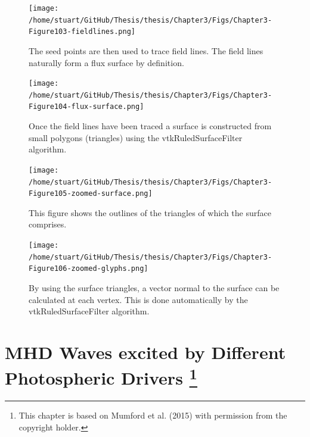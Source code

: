 \documentclass[a4paper,12pt,fourier,authoryear,custommargin]{Classes/PhDThesisPSnPDF}
\providecommand{\DIFdelbegin}{} %
\providecommand{\DIFdelend}{} %
\begin{document}
\begin{figure}[H]
    \centering
    \texttt{[image: /home/stuart/GitHub/Thesis/thesis/Chapter3/Figs/Chapter3-Figure103-fieldlines.png]}
    \caption{The seed points are then used to trace field lines. The field lines naturally form a flux surface by definition.}
    \label{fig:fieldlines}
\end{figure}

\begin{figure}[H]
    \centering
    \texttt{[image: /home/stuart/GitHub/Thesis/thesis/Chapter3/Figs/Chapter3-Figure104-flux-surface.png]}
    \caption{Once the field lines have been traced a surface is constructed from small polygons (triangles) using the vtkRuledSurfaceFilter algorithm.}
    \label{fig:flux-surface}
\end{figure}

\begin{figure}[H]
    \centering
    \texttt{[image: /home/stuart/GitHub/Thesis/thesis/Chapter3/Figs/Chapter3-Figure105-zoomed-surface.png]}
    \caption{This figure shows the outlines of the triangles of which the surface comprises.}
    \label{fig:zoomed-surface}
\end{figure}

\begin{figure}[H]
    \centering
    \texttt{[image: /home/stuart/GitHub/Thesis/thesis/Chapter3/Figs/Chapter3-Figure106-zoomed-glyphs.png]}
    \caption{By using the surface triangles, a vector normal to the surface can be calculated at each vertex. This is done automatically by the vtkRuledSurfaceFilter algorithm.}
    \label{fig:zoomed-glyphs}
\end{figure}
\DIFdelbegin %

\DIFdelend \clearpage{}%
%

%
\clearpage{}%

\chapter[MHD Waves excited by Different Photospheric Drivers]{MHD Waves excited by Different Photospheric Drivers \footnote{This chapter is based on Mumford et al. (2015) with permission from the copyright holder.}}\label{ch:drivers}
\end{document}

